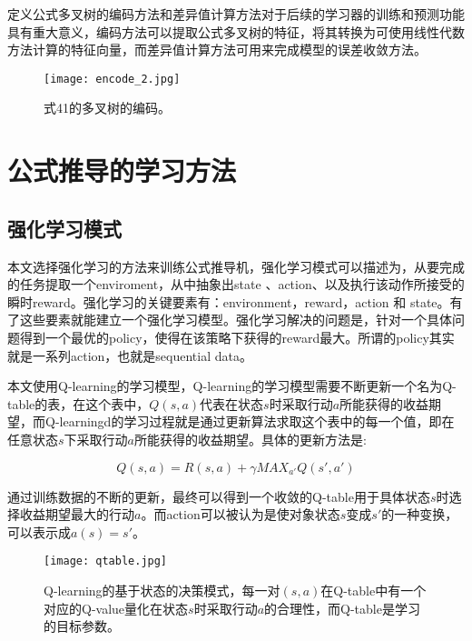 \documentclass[runningheads]{llncs}
\begin{document}
定义公式多叉树的编码方法和差异值计算方法对于后续的学习器的训练和预测功能具有重大意义，编码方法可以提取公式多叉树的特征，将其转换为可使用线性代数方法计算的特征向量，而差异值计算方法可用来完成模型的误差收敛方法。

\begin{figure}[H]
\centering
\texttt{[image: encode\_2.jpg]}
\caption{式41的多叉树的编码。}
\end{figure}













\section{公式推导的学习方法}
\subsection{强化学习模式}
本文选择强化学习的方法来训练公式推导机，强化学习模式可以描述为，从要完成的任务提取一个enviroment，从中抽象出state 、action、以及执行该动作所接受的瞬时reward。强化学习的关键要素有：environment，reward，action 和 state。有了这些要素就能建立一个强化学习模型。强化学习解决的问题是，针对一个具体问题得到一个最优的policy，使得在该策略下获得的reward最大。所谓的policy其实就是一系列action，也就是sequential data。 

本文使用Q-learning的学习模型\cite{ref_proc1}，Q-learning的学习模型需要不断更新一个名为Q-table的表，在这个表中，$Q(s,a)$代表在状态$s$时采取行动$a$所能获得的收益期望，而Q-learningd的学习过程就是通过更新算法求取这个表中的每一个值，即在任意状态$s$下采取行动$a$所能获得的收益期望。具体的更新方法是:

$$Q(s,a)=R(s,a)+\gamma MAX_{a'}Q(s',a') $$

通过训练数据的不断的更新，最终可以得到一个收敛的Q-table用于具体状态$s$时选择收益期望最大的行动$a$。而action可以被认为是使对象状态$s$变成$s'$的一种变换，可以表示成$a(s)=s'$。

\begin{figure}[H]
\centering
\texttt{[image: qtable.jpg]}
\caption{Q-learning的基于状态的决策模式，每一对$(s,a)$在Q-table中有一个对应的Q-value量化在状态$s$时采取行动$a$的合理性，而Q-table是学习的目标参数。}
\end{figure}
\end{document}
